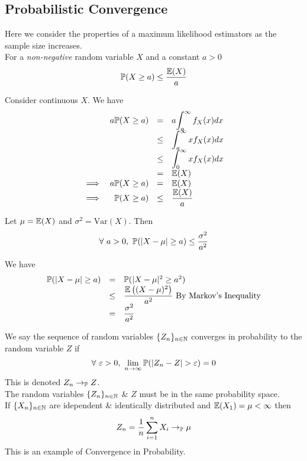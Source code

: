 \documentclass[11pt,a4paper]{article}
\begin{document}
\subsection{Probabilistic Convergence}

Here we consider the properties of a maximum likelihood estimators as the sample size increases.\\

For a \textit{non-negative} random variable $X$ and a constant $a>0$
$$\mathbb{P}(X\geq a)\leq\dfrac{\mathbb{E}(X)}{a}$$

Consider continuous $X$. We have
\[\begin{array}{rrcl}
&a\mathbb{P}(X\geq a)&=&a{\displaystyle\int_a^\infty f_X(x)dx}\\
&&\leq&{\displaystyle\int_a^\infty xf_X(x)dx}\\
&&\leq&{\displaystyle\int_0^\infty xf_X(x)dx}\\
&&=&\mathbb{E}(X)\\
\implies&a\mathbb{P}(X\geq a)&=&\mathbb{E}(X)\\
\implies&\mathbb{P}(X\geq a)&\leq&\dfrac{\mathbb{E}(X)}{a}
\end{array}\]
\proved

Let $\mu=\mathbb{E}(X)$ and $\sigma^2=\text{Var}(X)$. Then
$$\forall\ a>0,\ \mathbb{P}(|X-\mu|\geq a)\leq\dfrac{\sigma^2}{a^2}$$

We have
\[\begin{array}{rcl}
\mathbb{P}(|X-\mu|\geq a)&=&\mathbb{P}(|X-\mu|^2\geq a^2)\\
&\leq&\dfrac{\mathbb{E}\left((X-\mu)^2\right)}{a^2}\ \text{By Markov's Inequality}\\
&=&\dfrac{\sigma^2}{a^2}
\end{array}\]
\proved

We say the sequence of random variables $\{Z_n\}_{n\in\mathbb{N}}$ converges in probability to the random variable $Z$ if
$$\forall\ \varepsilon>0,\ \lim_{n\to\infty}\prob(|Z_n-Z|>\varepsilon)=0$$
\nb This is denoted $Z_n\to_{\mathbb{P}} Z$.\\
\nb The random variables $\{Z_n\}_{n\in\mathbb{N}}$ \& $Z$ must be in the same probability space.\\

If $\{X_n\}_{n\in\mathbb{N}}$ are idependent \& identically distributed and $\mathbb{E}(X_1)=\mu<\infty$ then
$$Z_n=\frac{1}{n}\sum_{i=1}^nX_i\to_{\mathbb{P}}\mu$$
\nb This is an example of Convergence in Probability.\\
\end{document}
